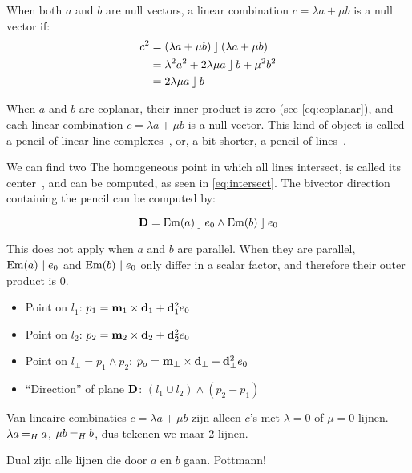 When both $a$ and $b$ are null vectors, a linear combination $c = \lambda a + \mu b$ is a null vector if:
\begin{align*}
  c^2 &= (\lambda a + \mu b) \mathbin{\rfloor} (\lambda a + \mu b) \\
  &= \lambda^2 a^2 + 2 \lambda \mu a \mathbin{\rfloor} b + \mu^2 b^2 \\
  &= 2 \lambda \mu a \mathbin{\rfloor} b
\end{align*}

When $a$ and $b$ are coplanar, their inner product is zero (see \autoref{eq:coplanar}), and each linear combination $c = \lambda a + \mu b$ is a null vector.  This kind of object is called a pencil of linear line complexes~\cite[Section 3.2.1]{Pottmann}, or, a bit shorter, a pencil of lines~\cite{Hongbo}.

We can find two The homogeneous point in which all lines intersect, is called its center~\cite{Hongbo}, and can be computed, as seen in \autoref{eq:intersect}.  The bivector direction containing the pencil can be computed by:

\begin{equation*}
  \mathbf{D} = \operatorname{Em}(a) \mathbin{\rfloor} e_0 \wedge \operatorname{Em}(b) \mathbin{\rfloor} e_0
\end{equation*}

This does not apply when $a$ and $b$ are parallel.  When they are parallel, $\operatorname{Em}(a) \mathbin{\rfloor} e_0$ and $\operatorname{Em}(b) \mathbin{\rfloor} e_0$ only differ in a scalar factor, and therefore their outer product is $0$.

\begin{itemize}
  \item Point on $l_1$: $p_1 = \mathbf{m}_1 \times \mathbf{d}_1 + \mathbf{d}_1^2 e_0$
  \item Point on $l_2$: $p_2 = \mathbf{m}_2 \times \mathbf{d}_2 + \mathbf{d}_2^2 e_0$
  \item Point on $l_\bot = p_1 \wedge p_2$: $p_o = \mathbf{m}_\bot \times \mathbf{d}_\bot + \mathbf{d}_\bot^2 e_0$
  \item ``Direction'' of plane $\mathbf{D}$: $(l_1 \cup l_2) \wedge (p_2 - p_1)$
\end{itemize}



Van lineaire combinaties $c = \lambda a + \mu b$ zijn alleen $c$'s met $\lambda = 0$ of $\mu = 0$ lijnen. $\lambda a \mathbin{=_{H}} a$, $\mu b \mathbin{=_{H}} b$, dus tekenen we maar 2 lijnen.

Dual zijn alle lijnen die door $a$ en $b$ gaan. Pottmann!


